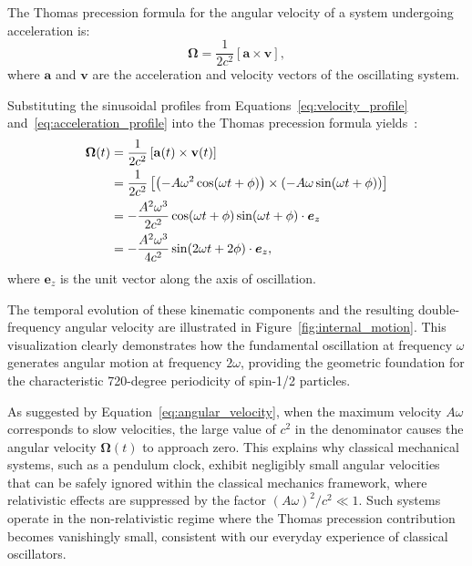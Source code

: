 \documentclass[%
 reprint,
 amsmath,amssymb,
 aps,
]{revtex4-1}
\numberwithin{equation}{section}%
\begin{document}
The Thomas precession formula for the angular velocity of a system undergoing acceleration is:
\begin{equation}
\boldsymbol{\Omega} = \frac{1}{2c^2}[\mathbf{a} \times \mathbf{v}], \label{eq:thomas_precession}
\end{equation}
where $\mathbf{a}$ and $\mathbf{v}$ are the acceleration and velocity vectors of the oscillating system.

Substituting the sinusoidal profiles from Equations~\eqref{eq:velocity_profile} and~\eqref{eq:acceleration_profile} into the Thomas precession formula yields~\cite{hanamura2309.0047}:
\begin{align}
\boldsymbol{\Omega}(t) 
&= \frac{1}{2c^2}\left[\mathbf{a}(t) \times \mathbf{v}(t)\right] \notag\\
&= \frac{1}{2c^2} \left[ \left(-A\omega^2 \cos(\omega t + \phi)\right) \times \left(-A\omega \sin(\omega t + \phi)\right) \right] \notag\\
&= -\frac{A^2\omega^3}{2c^2} \cos(\omega t + \phi) \sin(\omega t + \phi) \cdot \boldsymbol{e}_z \notag\\
&= -\frac{A^2\omega^3}{4c^2} \sin(2\omega t + 2\phi) \cdot \boldsymbol{e}_z, \label{eq:angular_velocity}
\end{align}
where $\boldsymbol{e}_z$ is the unit vector along the axis of oscillation.

The temporal evolution of these kinematic components and the resulting double-frequency angular velocity are illustrated in Figure~\ref{fig:internal_motion}. This visualization clearly demonstrates how the fundamental oscillation at frequency $\omega$ generates angular motion at frequency $2\omega$, providing the geometric foundation for the characteristic 720-degree periodicity of spin-1/2 particles.

As suggested by Equation~\eqref{eq:angular_velocity}, when the maximum velocity $A\omega$ corresponds to slow velocities, the large value of $c^2$ in the denominator causes the angular velocity $\boldsymbol{\Omega}(t)$ to approach zero. This explains why classical mechanical systems, such as a pendulum clock, exhibit negligibly small angular velocities that can be safely ignored within the classical mechanics framework, where relativistic effects are suppressed by the factor $(A\omega)^2/c^2 \ll 1$. Such systems operate in the non-relativistic regime where the Thomas precession contribution becomes vanishingly small, consistent with our everyday experience of classical oscillators.
\end{document}
